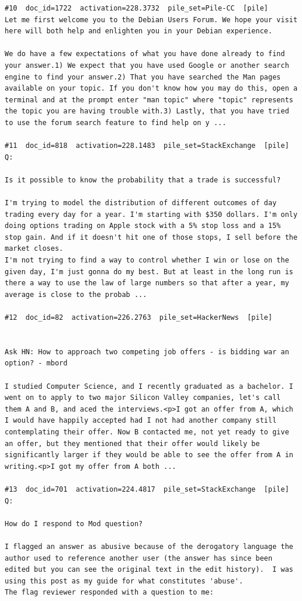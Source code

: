 \begin{verbatim}
#10  doc_id=1722  activation=228.3732  pile_set=Pile-CC  [pile]
Let me first welcome you to the Debian Users Forum. We hope your visit here will both help and enlighten you in your Debian experience.

We do have a few expectations of what you have done already to find your answer.1) We expect that you have used Google or another search engine to find your answer.2) That you have searched the Man pages available on your topic. If you don't know how you may do this, open a terminal and at the prompt enter "man topic" where "topic" represents the topic you are having trouble with.3) Lastly, that you have tried to use the forum search feature to find help on y ...

#11  doc_id=818  activation=228.1483  pile_set=StackExchange  [pile]
Q:

Is it possible to know the probability that a trade is successful?

I'm trying to model the distribution of different outcomes of day trading every day for a year. I'm starting with $350 dollars. I'm only doing options trading on Apple stock with a 5% stop loss and a 15% stop gain. And if it doesn't hit one of those stops, I sell before the market closes.
I'm not trying to find a way to control whether I win or lose on the given day, I'm just gonna do my best. But at least in the long run is there a way to use the law of large numbers so that after a year, my average is close to the probab ...

#12  doc_id=82  activation=226.2763  pile_set=HackerNews  [pile]


Ask HN: How to approach two competing job offers - is bidding war an option? - mbord

I studied Computer Science, and I recently graduated as a bachelor. I went on to apply to two major Silicon Valley companies, let's call them A and B, and aced the interviews.<p>I got an offer from A, which I would have happily accepted had I not had another company still contemplating their offer. Now B contacted me, not yet ready to give an offer, but they mentioned that their offer would likely be significantly larger if they would be able to see the offer from A in writing.<p>I got my offer from A both ...

#13  doc_id=701  activation=224.4817  pile_set=StackExchange  [pile]
Q:

How do I respond to Mod question?

I flagged an answer as abusive because of the derogatory language the author used to reference another user (the answer has since been edited but you can see the original text in the edit history).  I was using this post as my guide for what constitutes 'abuse'.
The flag reviewer responded with a question to me:


\end{verbatim}
